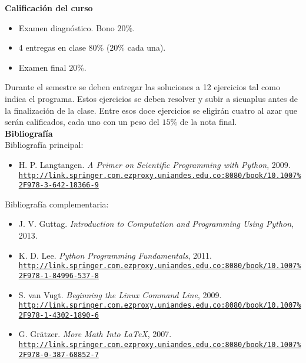 \documentclass[letterpaper,10pt,onecolumn]{article}
\begin{document}
\noindent\textbf{\large {} \quad Calificaci\'on del curso}\\[-0.2cm]

\begin{itemize}
	\item Examen diagnóstico. Bono $20\%$.
	\item 4 entregas en clase $80\%$ ($20\%$ cada una).
	\item Examen final $20\%$.
\end{itemize}
\noindent\normalsize Durante el semestre se deben entregar 
las soluciones a 12 ejercicios tal como indica el programa. 
Estos ejercicios se deben resolver y subir a sicuaplus antes de la
finalizaci\'on de la clase. 
Entre esos doce ejercicios se 
eligirán cuatro al azar que serán calificados, cada uno con un peso del $15\%$
de la nota final. 
\\[0.1cm] 

\noindent\textbf{\large {} \quad Bibliografía}\\[-0.2cm]

\noindent\normalsize Bibliografía principal:


\begin{itemize}
	\item H. P. Langtangen. \textit{A Primer on Scientific Programming with Python}, 2009.\\
	\href{http://link.springer.com.ezproxy.uniandes.edu.co:8080/book/10.1007\%2F978-3-642-18366-9}{\nolinkurl{http://link.springer.com.ezproxy.uniandes.edu.co:8080/book/10.1007\%2F978-3-642-18366-9}}\\[-0.6cm]
\end{itemize}

\noindent\normalsize Bibliografía complementaria:

\begin{itemize}
	\item J. V. Guttag. \textit{Introduction to Computation and Programming Using Python}, 2013.
	\item K. D. Lee. \textit{Python Programming Fundamentals}, 2011. \\
	\href{http://link.springer.com.ezproxy.uniandes.edu.co:8080/book/10.1007\%2F978-1-84996-537-8}{\nolinkurl{http://link.springer.com.ezproxy.uniandes.edu.co:8080/book/10.1007\%2F978-1-84996-537-8}}\\[-0.6cm]
	\item S. van Vugt. \textit{Beginning the Linux Command Line}, 2009.\\
	\href{http://link.springer.com.ezproxy.uniandes.edu.co:8080/book/10.1007\%2F978-1-4302-1890-6}{\nolinkurl{http://link.springer.com.ezproxy.uniandes.edu.co:8080/book/10.1007\%2F978-1-4302-1890-6}}\\[-0.6cm]
	\item G. Gr\"atzer. \textit{More Math Into  \LaTeX}, 2007.\\
	\href{http://link.springer.com.ezproxy.uniandes.edu.co:8080/book/10.1007\%2F978-0-387-68852-7}{\nolinkurl{http://link.springer.com.ezproxy.uniandes.edu.co:8080/book/10.1007\%2F978-0-387-68852-7}}
\end{itemize}
\end{document}
